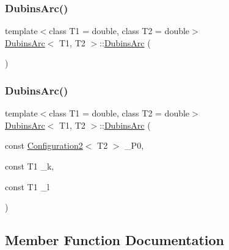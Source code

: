 \subsubsection{\texorpdfstring{DubinsArc()}{DubinsArc()}\hspace{0.1cm}{\footnotesize\ttfamily [1/2]}}
{\footnotesize\ttfamily template$<$class T1 = double, class T2 = double$>$ \\
\mbox{\hyperlink{class_dubins_arc}{Dubins\+Arc}}$<$ T1, T2 $>$\+::\mbox{\hyperlink{class_dubins_arc}{Dubins\+Arc}} (\begin{DoxyParamCaption}{ }\end{DoxyParamCaption})\hspace{0.3cm}{\ttfamily [inline]}}

\mbox{\label{class_dubins_arc_a213b0e587638328be1e448869e351475}} 
\subsubsection{\texorpdfstring{DubinsArc()}{DubinsArc()}\hspace{0.1cm}{\footnotesize\ttfamily [2/2]}}
{\footnotesize\ttfamily template$<$class T1 = double, class T2 = double$>$ \\
\mbox{\hyperlink{class_dubins_arc}{Dubins\+Arc}}$<$ T1, T2 $>$\+::\mbox{\hyperlink{class_dubins_arc}{Dubins\+Arc}} (\begin{DoxyParamCaption}\item[{const \mbox{\hyperlink{class_configuration2}{Configuration2}}$<$ T2 $>$}]{\+\_\+\+P0,  }\item[{const T1}]{\+\_\+k,  }\item[{const T1}]{\+\_\+l }\end{DoxyParamCaption})\hspace{0.3cm}{\ttfamily [inline]}}



\subsection{Member Function Documentation}
\mbox{\label{class_dubins_arc_af3fefdb90ba414db3560ef12b329f54a}} 
